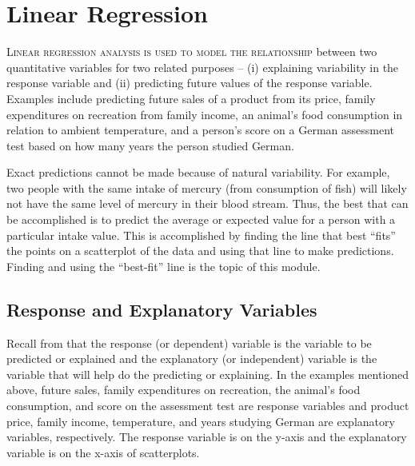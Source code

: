 \documentclass[10pt,openany]{book}\usepackage[]{graphicx}\usepackage[]{color}
\begin{document}
  \frontmatter
    

  \mainmatter










\chapter{Linear Regression}  \label{chap:Regress}

\minitoc
\vspace{48pt}

\lettrine{L}{inear regression analysis is used to model the relationship} between two quantitative variables for two related purposes -- (i) explaining variability in the response variable and (ii) predicting future values of the response variable. Examples include predicting future sales of a product from its price, family expenditures on recreation from family income, an animal's food consumption in relation to ambient temperature, and a person's score on a German assessment test based on how many years the person studied German.

Exact predictions cannot be made because of natural variability. For example, two people with the same intake of mercury (from consumption of fish) will likely not have the same level of mercury in their blood stream. Thus, the best that can be accomplished is to predict the average or expected value for a person with a particular intake value. This is accomplished by finding the line that best ``fits'' the points on a scatterplot of the data and using that line to make predictions. Finding and using the ``best-fit'' line is the topic of this module.


\section{Response and Explanatory Variables}
Recall from  that the response (or dependent) variable is the variable to be predicted or explained and the explanatory (or independent) variable is the variable that will help do the predicting or explaining. In the examples mentioned above, future sales, family expenditures on recreation, the animal's food consumption, and score on the assessment test are response variables and product price, family income, temperature, and years studying German are explanatory variables, respectively. The response variable is on the y-axis and the explanatory variable is on the x-axis of scatterplots.
\end{document}
